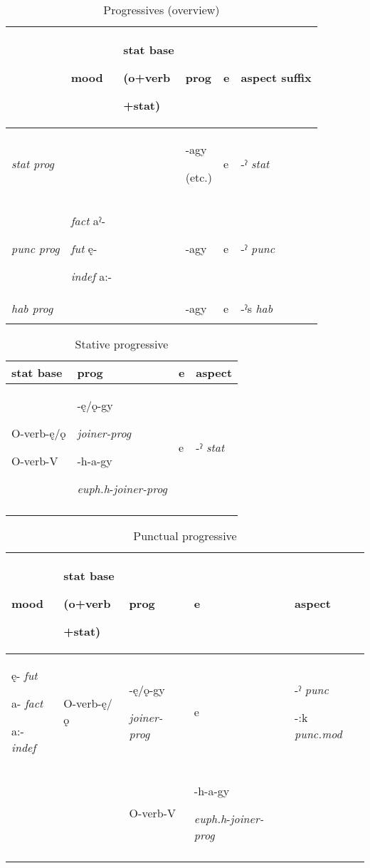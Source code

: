 \begin{table}
\caption{Progressives (overview)}
\label{tab:1:progoverview}
\scriptsize{
\begin{tabularx}{\textwidth}{XXXXXX}
\lsptoprule
& mood & stat base

(o+verb

+stat) & prog & e & aspect suffix\\
\midrule
{\itshape stat prog}

&  &  & {}-agy 

(etc.) & e & {}-ˀ \textit{stat}\\
{\itshape punc prog}

& \textit{fact} aˀ- 

\textit{fut} ę- 

\textit{indef} a:- &  & {}-agy & e & {}-ˀ \textit{punc}\\
{\itshape hab prog} &  &  & {}-agy & e & {}-ˀs \textit{hab}\\
\lspbottomrule
\end{tabularx}}
\end{table}



\begin{table}
\caption{Stative progressive}
\label{tab:1:statprog}
\scriptsize{
\begin{tabularx}{\textwidth}{XXXX}
\lsptoprule
stat base & prog & e & aspect\\
\midrule
O-verb-ę/ǫ

O-verb-V & {}-ę/ǫ-gy 

\textit{joiner-prog}


{}-h-a-gy 

\textit{euph.h}{}-\textit{joiner-prog} & e & {}-ˀ \textit{stat}\\
\lspbottomrule
\end{tabularx}}
\end{table}

\lipsum[1-1]


\begin{table}
\caption{Punctual progressive}
\label{tab:1:puncprog}
\scriptsize{
\begin{tabularx}{\textwidth}{XXXXX}
\lsptoprule
mood & stat base

(o+verb

+stat) & prog & e & aspect\\
\midrule
ę- \textit{fut}

a- \textit{fact}

a:- \textit{indef} & O-verb-ę/ǫ & {}-ę/ǫ-gy 

\textit{joiner-prog}

& e & {}-ˀ \textit{punc}

{}-:k \textit{punc.mod}\\
&  & O-verb-V & {}-h-a-gy 

\textit{euph.h}{}-\textit{joiner-prog} &   \\
\lspbottomrule
\end{tabularx}}
\end{table}

